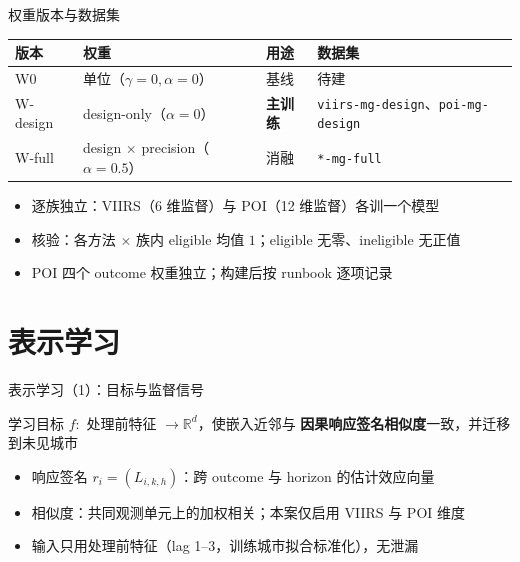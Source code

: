 \documentclass[aspectratio=169,11pt]{beamer}
\newcommand{\key}[1]{\textbf{\color{blue!55!black}#1}}
\begin{document}
\begin{frame}{权重版本与数据集}
  \small
  \begin{tabular}{llll}
    \toprule
    版本 & 权重 & 用途 & 数据集 \\
    \midrule
    W0 & 单位（$\gamma=0,\alpha=0$） & 基线 & 待建 \\
    W-design & design-only（$\alpha=0$） & \key{主训练} & \texttt{viirs-mg-design}、\texttt{poi-mg-design} \\
    W-full & design $\times$ precision（$\alpha=0.5$） & 消融 & \texttt{*-mg-full} \\
    \bottomrule
  \end{tabular}
  \medskip
  \begin{itemize}
    \item 逐族独立：VIIRS（6 维监督）与 POI（12 维监督）各训一个模型
    \item 核验：各方法 $\times$ 族内 eligible 均值 $1$；eligible 无零、ineligible 无正值
    \item POI 四个 outcome 权重独立；构建后按 runbook 逐项记录
  \end{itemize}
\end{frame}

\section{表示学习}

\begin{frame}{表示学习（1）：目标与监督信号}
  \small
  \begin{block}{学习目标}
    $f:$ 处理前特征 $\to \mathbb{R}^d$，使嵌入近邻与
    \key{因果响应签名相似度}一致，并迁移到未见城市
  \end{block}
  \begin{itemize}
    \item 响应签名 $r_i=(L_{i,k,h})$：跨 outcome 与 horizon 的估计效应向量
    \item 相似度：共同观测单元上的加权相关；本案仅启用 VIIRS 与 POI 维度
    \item 输入只用处理前特征（lag 1--3，训练城市拟合标准化），无泄漏
  \end{itemize}
\end{frame}
\end{document}
